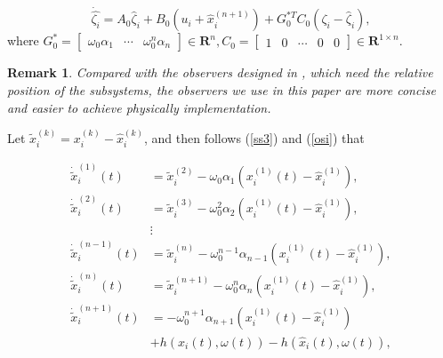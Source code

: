 \documentclass[english]{cccconf}
\newtheorem{remark}{Remark}
\begin{document}
\begin{equation}
  \label{osi}
  \dot {\hat {\zeta_i}} = A_0 \hat \zeta_i + B_0 (u_i + \hat x_i^{(n+1)}) + G_0^{*T} C_0 (\zeta_i - \hat \zeta_i),
\end{equation} 
where $G_{0}^{*}=\begin{bmatrix} \omega_0 \alpha_1  & \cdots & \omega_0^{n} \alpha_n\end{bmatrix} \in \mathbf R^{n}, C_{0}=\begin{bmatrix} 1 & 0 & \cdots & 0 & 0\end{bmatrix} \in \mathbf R^{1 \times n}$.

\begin{remark}
Compared with the observers designed in \cite{DongCCC2017}, which need the relative position of the subsystems, the observers we use in this paper are more concise and easier to achieve physically implementation.
\end{remark}


Let $\tilde x_i^{(k)} = x_i^{(k)} - \hat x_i^{(k)}$, and then follows (\ref{ss3}) and (\ref{osi}) that  



\begin{equation}
  \label{cei0}
  \begin{aligned}
  {{\dot {\tilde {x}}}}_i^{(1)} (t) &= {{\tilde {x}}}_i^{(2)} - \omega_0 \alpha_1 (x_i^{(1)}(t) - {{\hat {x}}}_i^{(1)}),\\
  {{\dot {\tilde {x}}}}_i^{(2)} (t) &= {{\tilde {x}}}_i^{(3)} - \omega_0^{2} \alpha_2 (x_i^{(1)}(t) - {{\hat {x}}}_i^{(1)}),\\
  & \vdots \\
  {{\dot {\tilde {x}}}}_i^{(n-1)} (t) &= {{\tilde {x}}}_i^{(n)} - \omega_0^{n-1} \alpha_{n-1} (x_i^{(1)}(t) - {{\hat {x}}}_i^{(1)}),\\
  {{\dot {\tilde {x}}}}_i^{(n)} (t) &= {{\tilde {x}}}_i^{(n+1)} - \omega_0^{n} \alpha_n (x_i^{(1)}(t) - {{\hat {x}}}_i^{(1)}),\\
  {{{\dot {\tilde {x}}}}_i^{(n+1)}}(t) &=-\omega_0^{n+1} \alpha_{n+1} (x_i^{(1)}(t) - {{\hat {x}}}_i^{(1)}) \\&+ h( x_i(t),\omega(t)) - h(\hat x_i(t),\omega(t)),\\
  \end{aligned}
\end{equation}

\end{document}

